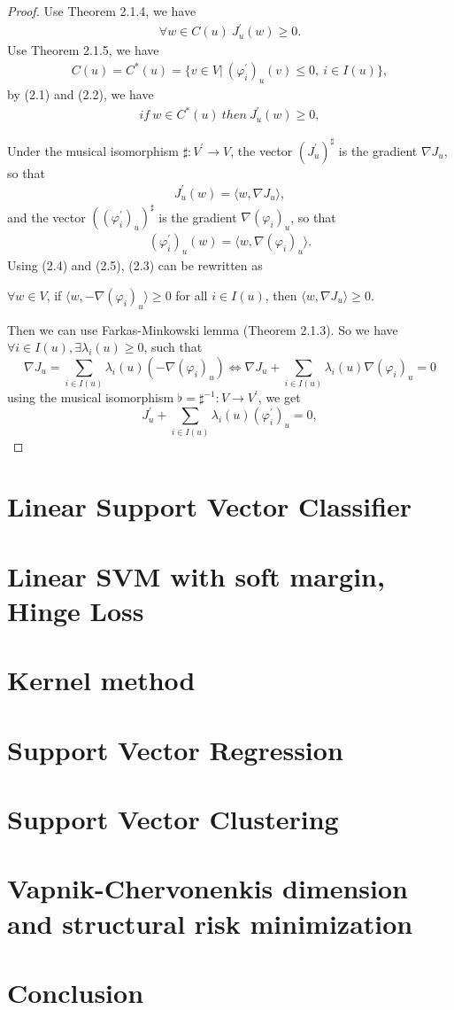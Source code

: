 \documentclass[a4paper,12pt]{report}
\begin{document}
\begin{proof}
    Use Theorem 2.1.4, we have
    \begin{align}
        \forall w\in C(u) \ J^\prime_u(w)\geq 0.
    \end{align}
    Use Theorem 2.1.5, we have
    \begin{align}
        C(u)=C^*(u)=\{ v\in V|\  (\varphi^\prime_i)_u(v)\leq 0, \ i\in I(u)\},
    \end{align}
    by (2.1) and (2.2), we have
    \begin{align}
        if\ w\in C^*(u)\ then\ J^\prime_u(w)\geq 0,
    \end{align}
    
    Under the musical isomorphism $\sharp:V^\prime\to V$, the vector $(J^\prime_u)^\sharp$ is the gradient $\nabla J_u$, so that
    \begin{align}
        J^\prime_u(w)=\langle w,\nabla J_u\rangle,
    \end{align}
    and the vector $((\varphi^\prime_i)_u)^\sharp$ is the gradient $\nabla(\varphi_i)_u$, so that
    \begin{align}
        (\varphi^\prime_i)_u(w)=\langle w,\nabla(\varphi_i)_u\rangle.
    \end{align}
    Using (2.4) and (2.5), (2.3) can be rewritten as 
    \begin{center}
        $\forall w\in V$, if $\langle w,-\nabla (\varphi_i)_u\rangle \geq 0$ for all $i\in I(u)$, then $\langle w, \nabla J_u\rangle \geq 0$.
    \end{center}
    Then we can use Farkas-Minkowski lemma (Theorem 2.1.3). So we have $\forall i\in I(u), \exists \lambda_i(u)\geq 0$, such that
    \[
        \nabla J_u = \sum_{i\in I(u)} \lambda_i(u) (-\nabla(\varphi_i)_u) \Leftrightarrow \nabla J_u+\sum_{i\in I(u)}\lambda_i(u)\nabla(\varphi_i)_u = 0
    \]
    using the musical isomorphism $\flat=\sharp^{-1}:V\to V^\prime$, we get
    \[
        J^\prime_u + \sum_{i\in I(u)}\lambda_i(u)(\varphi^\prime_i)_u=0,
    \]
\end{proof}



\chapter{Linear Support Vector Classifier}
\chapter{Linear SVM with soft margin, Hinge Loss}
\chapter{Kernel method}
\chapter{Support Vector Regression}
\chapter{Support Vector Clustering}
\chapter{Vapnik-Chervonenkis dimension and structural risk minimization}
\chapter{Conclusion}

{}

\end{document}
